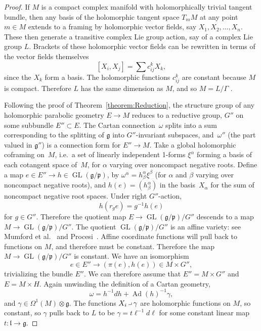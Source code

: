 \documentclass[11pt]{article}
\newcommand{\hook}{\ensuremath{\mathbin{ \hbox{\vrule height1.4pt
        width4pt depth-1pt \vrule height4pt width0.4pt depth-1pt}}}}
\newcommand{\GL}[1]{\operatorname{GL}\left({#1}\right)}
\newcommand{\nForms}[2]{\ensuremath{\Omega^{#1} \left ( {#2} \right
    )}}
\DeclareMathOperator{\Ad}{Ad}
\newcommand{\LieG}{\ensuremath{\mathfrak{g}}}
\newcommand{\LieL}{\ensuremath{\mathfrak{l}}}
\newcommand{\gtot}{\mathfrak{g}}
\newcommand{\gstruc}{\mathfrak{p}}
\begin{document}
\begin{proof}
If $M$ is a compact complex manifold with holomorphically
trivial tangent bundle, then any basis of the
holomorphic tangent space $T_m M$ at any point $m \in M$
extends to a framing by holomorphic vector f\/ields, say $X_1, X_2, \dots, X_n$.
These then generate a transitive complex Lie group action,
say of a complex Lie group $L$. Brackets of these
holomorphic vector f\/ields can be rewritten in terms
of the vector f\/ields themselves
\[
\left[X_i,X_j\right]=\sum c^k_{ij} X_k,
\]
since the $X_k$ form a basis. The holomorphic functions
$c^k_{ij}$ are constant because $M$ is compact. Therefore $L$ has the same
dimension as $M$, and so $M = L/\Gamma$ \cite{Wang:1954}.

Following the proof of Theorem~\ref{theorem:Reduction}, the structure group of any
holomorphic parabolic geometry $E \to M$ reduces to a reductive group, $G''$
on some subbundle $E'' \subset E$. The Cartan connection~$\omega$ splits into a sum corresponding to the splitting
of $\mathfrak{g}$ into $G''$-invariant subspaces,
and~$\omega''$ (the part valued in $\mathfrak{g}''$)
is a connection form for $E'' \to M$. Take a global
holomorphic coframing on~$M$, i.e.\ a set of linearly independent 1-forms
$\xi^{\alpha}$ forming a basis of each cotangent space of~$M$, for
$\alpha$ varying over noncompact negative roots.
Def\/ine a map $e \in E'' \to h
\in \GL{\gtot/\gstruc}$, by $\omega^{\alpha}=h^{\alpha}_{\beta}
\xi^{\beta}$ (for $\alpha$ and $\beta$ varying over
noncompact negative roots),
and $h(e) =  (h^{\alpha}_{\beta} )$ in the basis~$X_{\alpha}$ for the sum of noncompact negative
root spaces. Under right
$G''$-action,
\[
h\left(r_{g}e\right)=g^{-1}h(e)
\]
for $g \in G''.$ Therefore the quotient map $E \!\to\! \GL{\gtot/\gstruc}/G''$
descends to a map $M \!\to\! \GL{\gtot/\gstruc}/G''$.
The quotient $\GL{\gtot/\gstruc}/G''$ is an af\/f\/ine variety:
see Mumford et al.~\cite[Theorem~1.1, p.~27]{Mumford/Fogarty/Kirwan:1994}
and Procesi~\cite[Theorem~2, p.~556]{Procesi:2007}.
Af\/f\/ine coordinate functions will pull back to functions on $M$,
and therefore must be constant.
Therefore the map $M \to \GL{\gtot/\gstruc}/G''$ is constant.
We have an isomorphism
\[
e \in E'' \to \left(\pi(e),h(e)\right) \in M \times G'',
\]
trivializing the bundle $E''$. We can therefore assume
that $E'' = M \times G''$ and $E = M \times H$.
Again unwinding the def\/inition of a Cartan
geometry,
\[
\omega = h^{-1}   dh + \Ad(h)^{-1}\gamma,
\]
and $\gamma \in \nForms{1}{M} \otimes \LieG$.
The functions $X_i \hook \gamma$
are holomorphic functions on $M$,
so constant, so $\gamma$ pulls back to $L$ to be
$\gamma=t \ell^{-1}   d\ell$ for some constant
linear map $t : \LieL \to \LieG$.
\end{proof}
\end{document}
